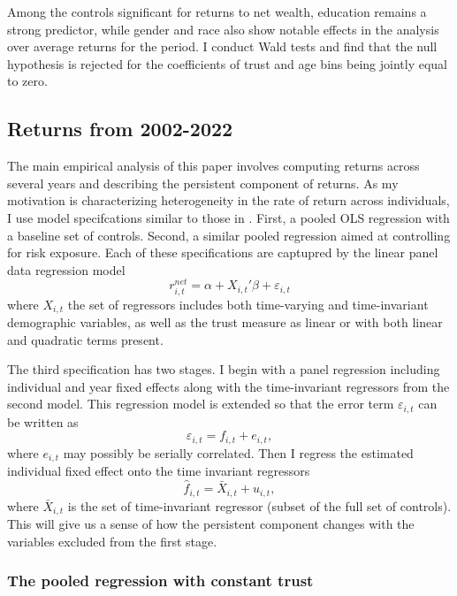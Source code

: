 \par Among the controls significant for returns to net wealth, education remains a strong predictor, while gender and race also show notable effects in the analysis over average returns for the period. I conduct Wald tests and find that the null hypothesis is rejected for the coefficients of trust and age bins being jointly equal to zero. 

\label{tab:returns_r5_trust_general_avg_win}
\FloatBarrier

\subsection{Returns from 2002-2022}

\par The main empirical analysis of this paper involves computing returns across several years and describing the persistent component of returns. As my motivation is characterizing heterogeneity in the rate of return across individuals, I use model specifcations similar to those in \cite{aflgdmlp20}. First, a pooled OLS regression with a baseline set of controls. Second, a similar pooled regression aimed at controlling for risk exposure. Each of these specifications are captupred by the linear panel data regression model \[r^{net}_{i,t} = \alpha +  X_{i,t}'\beta + \varepsilon_{i,t}\] where $X_{i,t}$ the set of regressors includes both time-varying and time-invariant demographic variables, as well as the trust measure as linear or with both linear and quadratic terms present. 

\par The third specification has two stages. I begin with a panel regression including individual and year fixed effects along with the time-invariant regressors from the second model. This regression model is extended so that the error term $\varepsilon_{i,t}$ can be written as \[\varepsilon_{i,t} = f_{i,t} + e_{i,t},\] where $e_{i,t}$ may possibly be serially correlated. Then I regress the estimated individual fixed effect onto the time invariant regressors \[\hat{f}_{i,t} = \bar{X}_{i,t} + u_{i,t},\] where $\bar{X}_{i,t}$ is the set of time-invariant regressor (subset of the full set of controls). This will give us a sense of how the persistent component changes with the variables excluded from the first stage. 

\subsubsection{The pooled regression with constant trust}

